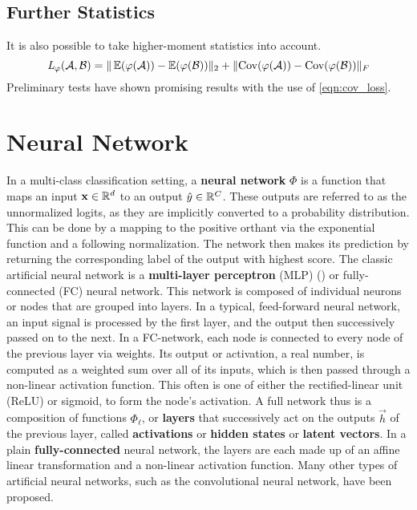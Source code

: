 \subsection{Further Statistics}

It is also possible to take higher-moment statistics into account. 
%
\begin{equation*}
    \textit{L} _{\varphi} (\mathcal A, \mathcal B) = 
    \|\operatorname{\mathbb{E}} ({\varphi (\mathcal A)}) - \operatorname{\mathbb{E}} ({\varphi (\mathcal B)})\|_2 +
    \|\text{Cov} ({\varphi (\mathcal A)}) - \text{Cov} ({\varphi (\mathcal B)})\|_F
    \label{eqn:cov_loss}
\end{equation*}
%
Preliminary tests have shown promising results with the use of \cref{eqn:cov_loss}.



\section{Neural Network}
\label{sec:nn_def}

In a multi-class classification setting, a \textbf{neural network} $\Phi$ is a function that maps an input $\mathbf x \in \mathbb{R}^d$ to an output $\hat y \in \mathbb{R}^C$.
These outputs are referred to as the unnormalized logits, as they are 
implicitly converted to a probability distribution.
This can be done by a mapping to the positive orthant via the exponential function and
a following normalization.
The network then makes its prediction by returning the corresponding label
of the output with highest score.
The classic artificial neural network is a 
\textbf{multi-layer perceptron} (MLP) (\cite{rosenblatt1961principles})
or fully-connected (FC) neural network.
This network is composed of individual neurons or nodes 
that are grouped into layers.
In a typical, feed-forward neural network, an input signal is processed by the first
layer, and the output then successively passed on to the next.
In a FC-network, each node is connected to every node of the previous layer via weights.
Its output or activation, a real number, is computed as a weighted sum over all of 
its inputs, which is then passed through a non-linear activation function.
This often is one of either the rectified-linear unit (ReLU) or sigmoid, to form the node's activation. 
A full network thus is a composition of functions $\Phi_\ell$, or \textbf{layers} that 
successively act on the outputs $\vec h$ of the previous layer, called \textbf{activations} or \textbf{hidden states} or \textbf{latent vectors}. 
In a plain \textbf{fully-connected} neural network, the layers are each made up of an affine linear transformation and a non-linear activation function.
Many other types of artificial neural networks, such as the convolutional neural network, 
have been proposed.

